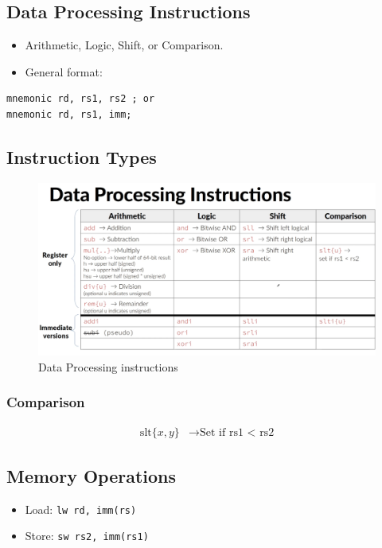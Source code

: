 \documentclass{article}
\begin{document}
\subsection*{Data Processing Instructions}
\begin{itemize}
    \item Arithmetic, Logic, Shift, or Comparison.
    \item General format:
\end{itemize}
\begin{lstlisting}
mnemonic rd, rs1, rs2 ; or
mnemonic rd, rs1, imm;
\end{lstlisting}

\subsection*{Instruction Types}
\begin{figure}
    \includegraphics[width=15cm]{images/dtprcsinstrc.png}
    \caption{Data Processing instructions}
    \label{figure:dtprcsinstrc}
\end{figure}

\subsubsection*{Comparison}
\begin{align*}
    \text{slt} \{x, y\} &\rightarrow \text{Set if rs1 < rs2}
\end{align*}

\subsection*{Memory Operations}
\begin{itemize}
    \item Load: \texttt{lw rd, imm(rs)}
    \item Store: \texttt{sw rs2, imm(rs1)}
\end{itemize}
\end{document}
